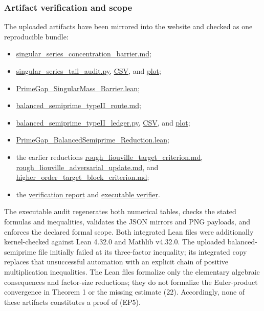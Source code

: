 \subsubsection*{Artifact verification and scope}

The uploaded artifacts have been mirrored into the website and checked as one reproducible bundle:

\begin{itemize}
\item \href{artifacts/erdos/gpt_pro_5.6/5/singular_series_concentration_barrier.md}{singular\_series\_concentration\_barrier.md};
\item \href{artifacts/erdos/gpt_pro_5.6/5/singular_series_tail_audit.py}{singular\_series\_tail\_audit.py}, \href{artifacts/erdos/gpt_pro_5.6/5/singular_series_tail_audit.csv}{CSV}, and \href{artifacts/erdos/gpt_pro_5.6/5/singular_series_tail_mass.png}{plot};
\item \href{artifacts/erdos/gpt_pro_5.6/5/PrimeGap_SingularMass_Barrier.lean}{PrimeGap\_SingularMass\_Barrier.lean};
\item \href{artifacts/erdos/gpt_pro_5.6/5/balanced_semiprime_typeII_route.md}{balanced\_semiprime\_typeII\_route.md};
\item \href{artifacts/erdos/gpt_pro_5.6/5/balanced_semiprime_typeII_ledger.py}{balanced\_semiprime\_typeII\_ledger.py}, \href{artifacts/erdos/gpt_pro_5.6/5/balanced_semiprime_typeII_ledger.csv}{CSV}, and \href{artifacts/erdos/gpt_pro_5.6/5/balanced_semiprime_typeII_tradeoff.png}{plot};
\item \href{artifacts/erdos/gpt_pro_5.6/5/PrimeGap_BalancedSemiprime_Reduction.lean}{PrimeGap\_BalancedSemiprime\_Reduction.lean};
\item the earlier reductions \href{artifacts/erdos/gpt_pro_5.6/5/rough_liouville_target_criterion.md}{rough\_liouville\_target\_criterion.md}, \href{artifacts/erdos/gpt_pro_5.6/5/rough_liouville_adversarial_update.md}{rough\_liouville\_adversarial\_update.md}, and \href{artifacts/erdos/gpt_pro_5.6/5/higher_order_target_block_criterion.md}{higher\_order\_target\_block\_criterion.md};
\item the \href{artifacts/erdos/gpt_pro_5.6/5/README.md}{verification report} and \href{artifacts/erdos/gpt_pro_5.6/5/verify_artifacts.py}{executable verifier}.
\end{itemize}

The executable audit regenerates both numerical tables, checks the stated formulas and inequalities, validates the JSON mirrors and PNG payloads, and enforces the declared formal scope. Both integrated Lean files were additionally kernel-checked against Lean 4.32.0 and Mathlib v4.32.0. The uploaded balanced-semiprime file initially failed at its three-factor inequality; its integrated copy replaces that unsuccessful automation with an explicit chain of positive multiplication inequalities. The Lean files formalize only the elementary algebraic consequences and factor-size reductions; they do not formalize the Euler-product convergence in Theorem 1 or the missing estimate (22). Accordingly, none of these artifacts constitutes a proof of (EP5).

